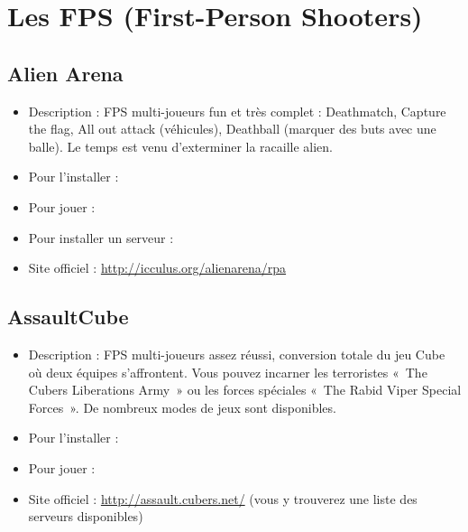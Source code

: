 \section{Les FPS (First-Person Shooters)}
\subsection{Alien Arena}
\begin{itemize}
\begingroup
{}
\item Description : FPS multi-joueurs fun et très complet : Deathmatch, Capture the flag, All out attack (véhicules), Deathball (marquer des buts avec une balle). Le temps est venu d'exterminer la racaille alien.{\par}
\item Pour l'installer : 
\item Pour jouer : 
\item Pour installer un serveur : 
\item Site officiel : \url{http://icculus.org/alienarena/rpa}{\par}
\endgroup
\end{itemize}
\subsection{AssaultCube}
\begin{itemize}
\begingroup
{}
\item Description : FPS multi-joueurs assez réussi, conversion totale du jeu Cube où deux équipes s'affrontent. Vous pouvez incarner les terroristes «~The Cubers Liberations Army~» ou les forces spéciales «~The Rabid Viper Special Forces~». De nombreux modes de jeux sont disponibles.{\par}
\endgroup
\item Pour l'installer : 
\item Pour jouer : 
\item Site officiel : \url{http://assault.cubers.net/} (vous y trouverez une liste des serveurs disponibles){\par}
\end{itemize}
\newpage

